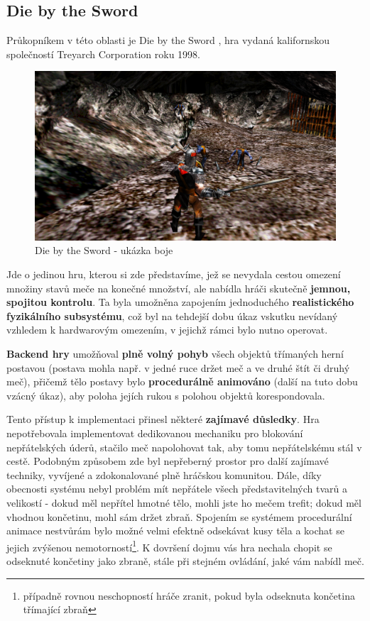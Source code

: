 \subsection{Die by the Sword} \label{dieByTheSwordDescriptionSubsection}

Průkopníkem v této oblasti je Die by the Sword \cite{DieByTheSword}, hra vydaná kalifornskou společností Treyarch Corporation roku 1998. 


\begin{figure}[ht]\centering
    \center
    \includegraphics[width=140mm]{../img/DbtS-combat.png}
    \caption{Die by the Sword - ukázka boje}
    \label{obr01:dbts}
\end{figure} 


Jde o jedinou hru, kterou si zde představíme, jež se nevydala cestou omezení množiny stavů meče na konečné množství, ale nabídla hráči skutečně \textbf{jemnou, spojitou kontrolu}. Ta byla umožněna zapojením jednoduchého \textbf{realistického fyzikálního subsystému}, což byl na tehdejší dobu úkaz vskutku nevídaný vzhledem k hardwarovým omezením, v jejichž rámci bylo nutno operovat.

\textbf{Backend hry} umožňoval \textbf{plně volný pohyb} všech objektů třímaných herní postavou (postava mohla např. v jedné ruce držet meč a ve druhé štít či druhý meč), přičemž tělo postavy bylo \textbf{procedurálně animováno} (další na tuto dobu vzácný úkaz), aby poloha jejích rukou s polohou objektů korespondovala.

Tento přístup k implementaci přinesl některé \textbf{zajímavé důsledky}. Hra nepotřebovala implementovat dedikovanou mechaniku pro blokování nepřátelských úderů, stačilo meč napolohovat tak, aby tomu nepřátelskému stál v cestě. Podobným způsobem zde byl nepřeberný prostor pro další zajímavé techniky, vyvíjené a zdokonalované plně hráčskou komunitou. Dále, díky obecnosti systému nebyl problém mít nepřátele všech představitelných tvarů a velikostí - dokud měl nepřítel hmotné tělo, mohli jste ho mečem trefit; dokud měl vhodnou končetinu, mohl sám držet zbraň. Spojením se systémem procedurální animace nestvůrám bylo možné velmi efektně odsekávat kusy těla a kochat se jejich zvýšenou nemotorností\footnote{případně rovnou neschopností hráče zranit, pokud byla odseknuta končetina třímající zbraň}. K dovršení dojmu vás hra nechala chopit se odseknuté končetiny jako zbraně, stále při stejném ovládání, jaké vám nabídl meč.

